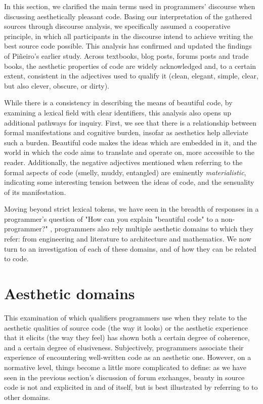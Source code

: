 In this section, we clarified the main terms used in programmers' discourse when discussing aesthetically pleasant code. Basing our interpretation of the gathered sources through discourse analysis, we specifically assumed a cooperative principle, in which all participants in the discourse intend to achieve writing the best source code possible. This analysis has confirmed and updated the findings of Piñeiro's earlier study. Across textbooks, blog posts, forums posts and trade books, the aesthetic properties of code are widely acknowledged and, to a certain extent, consistent in the adjectives used to qualify it (clean, elegant, simple, clear, but also clever, obscure, or dirty).

While there is a consistency in describing the means of beautiful code, by examining a lexical field with clear identifiers, this analysis also opens up additional pathways for inquiry. First, we see that there is a relationship between formal manifestations and cognitive burden, insofar as aesthetics help alleviate such a burden. Beautiful code makes the ideas which are embedded in it, and the world in which the code aims to translate and operate on, more accessible to the reader. Additionally, the negative adjectives mentioned when referring to the formal aspects of code (smelly, muddy, entangled) are eminently \emph{materialistic}, indicating some interesting tension between the ideas of code, and the sensuality of its manifestation.

Moving beyond strict lexical tokens, we have seen in the breadth of responses in a programmer's question of "How can you explain "beautiful code" to a non-programmer?" \citep{stackoverflow_how_2013}, programmers also rely multiple aesthetic domains to which they refer: from engineering and literature to architecture and mathematics. We now turn to an investigation of each of these domains, and of how they can be related to code.

\pagebreak

\section{Aesthetic domains}
\label{sec:aesthetic-domains}

This examination of which qualifiers programmers use when they relate to the aesthetic qualities  of source code (the way it looks) or the aesthetic experience that it elicits (the way they feel) has shown both a certain degree of coherence, and a certain degree of elusiveness. Subjectively, programmers associate their experience of encountering well-written code as an aesthetic one. However, on a normative level, things become a little more complicated to define: as we have seen in the previous section's discussion of forum exchanges, beauty in source code is not and explicited in and of itself, but is best illustrated by referring to to other domains.

